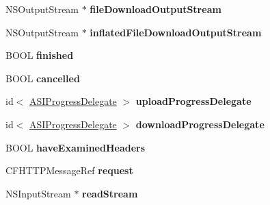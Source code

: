 \begin{DoxyCompactItemize}
\item 
\hypertarget{interface_a_s_i_h_t_t_p_request_a2bd3383be1f15af5c3312c7bb41522bd}{
\-N\-S\-Output\-Stream $\ast$ {\bfseries file\-Download\-Output\-Stream}}
\label{interface_a_s_i_h_t_t_p_request_a2bd3383be1f15af5c3312c7bb41522bd}

\item 
\hypertarget{interface_a_s_i_h_t_t_p_request_ae1aa1793492ac50e00c8b9a1e9aecc09}{
\-N\-S\-Output\-Stream $\ast$ {\bfseries inflated\-File\-Download\-Output\-Stream}}
\label{interface_a_s_i_h_t_t_p_request_ae1aa1793492ac50e00c8b9a1e9aecc09}

\item 
\hypertarget{interface_a_s_i_h_t_t_p_request_a5cdc1c7352ec4374a771d1dad63480bd}{
\-B\-O\-O\-L {\bfseries finished}}
\label{interface_a_s_i_h_t_t_p_request_a5cdc1c7352ec4374a771d1dad63480bd}

\item 
\hypertarget{interface_a_s_i_h_t_t_p_request_aab7791bbac6acfd0e8e8f59b6a7890d0}{
\-B\-O\-O\-L {\bfseries cancelled}}
\label{interface_a_s_i_h_t_t_p_request_aab7791bbac6acfd0e8e8f59b6a7890d0}

\item 
\hypertarget{interface_a_s_i_h_t_t_p_request_ac3447bd84be5cdb2876227383766797b}{
id$<$ \hyperlink{protocol_a_s_i_progress_delegate-p}{\-A\-S\-I\-Progress\-Delegate} $>$ {\bfseries upload\-Progress\-Delegate}}
\label{interface_a_s_i_h_t_t_p_request_ac3447bd84be5cdb2876227383766797b}

\item 
\hypertarget{interface_a_s_i_h_t_t_p_request_ac7e83d48327cd284ca98c50ee3d41f26}{
id$<$ \hyperlink{protocol_a_s_i_progress_delegate-p}{\-A\-S\-I\-Progress\-Delegate} $>$ {\bfseries download\-Progress\-Delegate}}
\label{interface_a_s_i_h_t_t_p_request_ac7e83d48327cd284ca98c50ee3d41f26}

\item 
\hypertarget{interface_a_s_i_h_t_t_p_request_aede435a85f87109a18819b3d69976fec}{
\-B\-O\-O\-L {\bfseries have\-Examined\-Headers}}
\label{interface_a_s_i_h_t_t_p_request_aede435a85f87109a18819b3d69976fec}

\item 
\hypertarget{interface_a_s_i_h_t_t_p_request_a43c23393b18061ee1ab4c5714c23867d}{
\-C\-F\-H\-T\-T\-P\-Message\-Ref {\bfseries request}}
\label{interface_a_s_i_h_t_t_p_request_a43c23393b18061ee1ab4c5714c23867d}

\item 
\hypertarget{interface_a_s_i_h_t_t_p_request_a89d8abfbc7a20ca85c69a795154b75e6}{
\-N\-S\-Input\-Stream $\ast$ {\bfseries read\-Stream}}
\label{interface_a_s_i_h_t_t_p_request_a89d8abfbc7a20ca85c69a795154b75e6}


\end{DoxyCompactItemize}
